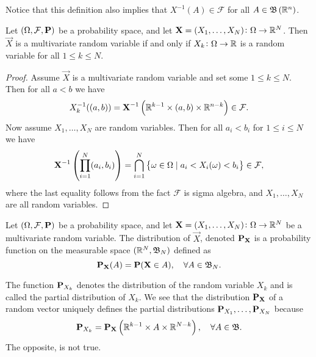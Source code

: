 \documentclass[11pt,a4paper]{article}
\begin{document}
  Notice that this definition also implies that $X^{-1}(A) \in \mathcal F$
  for all $A \in \mathfrak B\left(\mathbb{R}^n\right)$.

  \begin{proposition}
    Let $(\Omega, \mathcal F, \mathbf{P})$ be a probability space, 
    and let $\boldsymbol{\mathbf{X}} = (X_1,\dots,X_N) \colon \Omega \to \mathbb{R}^N$. 
    Then $\vec{X}$ is a multivariate random variable if and only if 
    $X_k \colon \Omega \to \mathbb{R}$ is a random variable for all $1 \le k \le N$.
  \end{proposition}
  \begin{proof}
    Assume $\vec{X}$ is a multivariate random variable and set some $1 \le k \le N$.
    Then for all $a < b$ we have
    \[
      X_k^{-1}((a,b)) = 
      \boldsymbol{\mathbf{X}}^{-1}\left(\mathbb{R}^{k-1} \times (a,b) \times \mathbb{R}^{n-k}\right) \in
      \mathcal F.
    \]
    Now assume $X_1,\dots,X_N$ are random variables. Then for all $a_i < b_i$
    for $1 \le i \le N$ we have
    \[
      \boldsymbol{\mathbf{X}}^{-1}\left(\prod_{i=1}^{N} (a_i, b_i)\right) =
      \bigcap_{i=1}^{N}\set{\omega \in \Omega \mid a_i < X_i(\omega) < b_i} \in
      \mathcal F,
    \]
    where the last equality follows from the fact $\mathcal F$ is  sigma
    algebra, and $X_1,\dots,X_N$ are all random variables.
  \end{proof}

  \begin{definition}
    Let $(\Omega, \mathcal F, \mathbf{P})$ be a probability space, 
    and let $\boldsymbol{\mathbf{X}} = (X_1,\dots,X_N) \colon \Omega \to \mathbb{R}^N$ be a multivariate
    random variable.
    The distribution of $\vec{X}$, denoted $\mathbf{P}_{\boldsymbol{\mathbf{X}}}$ is a probability function
    on the measurable space $(\mathbb{R}^N, \mathfrak B_N)$ defined as
    \[
      \mathbf{P}_{\boldsymbol{\mathbf{X}}}(A) =
      \mathbf{P}(\boldsymbol{\mathbf{X}} \in A), \quad
      \forall A \in \mathfrak  B_N.
    \]
  \end{definition}

  \begin{remark}
    The function $\mathbf{P}_{X_k}$ denotes the distribution of the random
    variable $X_k$ and is called the partial distribution of $X_k$.
    We see that the distribution $\mathbf{P}_{\boldsymbol{\mathbf{X}}}$ of a random vector uniquely
    defines the partial distributions $\mathbf{P}_{X_1},\dots,\mathbf{P}_{X_N}$
    because
    \[
      \mathbf{P}_{X_k} =
      \mathbf{P}_{\boldsymbol{\mathbf{X}}}\left(\mathbb{R}^{k-1} \times A \times \mathbb{R}^{N-k}\right),
      \quad \forall A \in \mathfrak B.
    \]
    The opposite, is not true.
  \end{remark}
\end{document}
